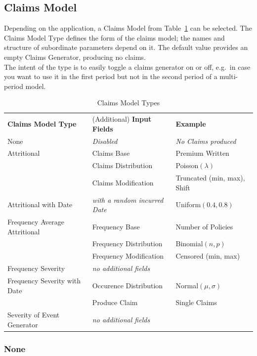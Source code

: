 \subsection{Claims Model}
\label{sec:ClaimsModel}
\label{subsec:ClaimsModel}

Depending on the application, a Claims Model  from Table~\ref{tab:ClaimsModelType} can be selected. The Claims Model Type defines the form of the claims model; the names and structure of subordinate parameters depend on it. The default value  provides an empty Claims Generator, producing no claims. \\ The intent of the  type is to easily toggle a claims generator on or off, e.g.~in case you want to use it in the first period but not in the second period of a multi-period model. 

\begin{table}
	\centering
		\begin{tabular}{lll}
			\textbf{Claims Model Type} & (Additional) \textbf{Input Fields} & \textbf{Example} \\
			None & \textit{Disabled} & \textit{No Claims produced} \\
			Attritional & Claims Base & Premium Written \\
				& Claims Distribution & Poisson$(\lambda)$ \\
				& Claims Modification & Truncated (min, max), Shift\\
			Attritional with Date & \textit{with a random incurred Date} & Uniform$(0.4,0.8)$ \\
			Frequency Average Attritional & Frequency Base & Number of Policies \\
				& Frequency Distribution & Binomial$(n, p)$ \\
				& Frequency Modification & Censored (min, max) \\
			Frequency Severity & \textit{no additional fields} \\
			Frequency Severity with Date & Occurence Distribution & Normal$(\mu, \sigma)$\\
				& Produce Claim & Single Claims \\
			Severity of Event Generator & \textit{no additional fields} \\
		\end{tabular}
	\caption{Claims Model Types}
	\label{tab:ClaimsModelType}
\end{table}

\subsubsection*{None}

